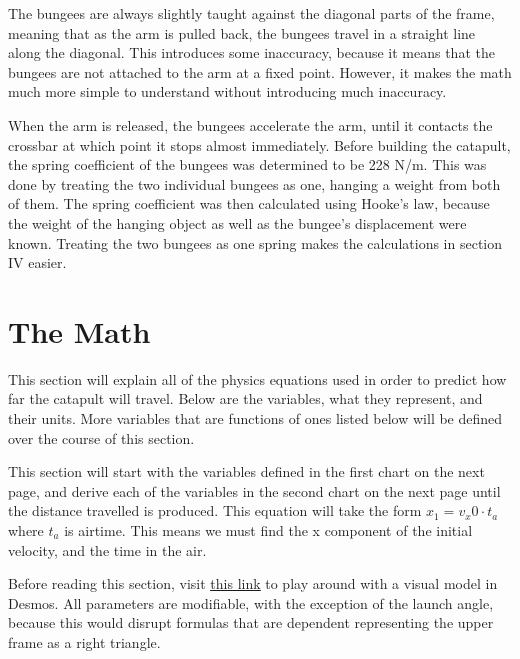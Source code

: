\documentclass[10pt]{article}
\begin{document}
\begin{flushleft}
    \par
    The bungees are always slightly taught against the diagonal parts of the frame, meaning that as the arm is pulled back, the bungees travel in a straight line along the diagonal.
    This introduces some inaccuracy, because it means that the bungees are not attached to the arm at a fixed point.
    However, it makes the math much more simple to understand without introducing much inaccuracy.

    \par
    When the arm is released, the bungees accelerate the arm, until it contacts the crossbar at which point it stops almost immediately.
    Before building the catapult, the spring coefficient of the bungees was determined to be 228 N/m.
    This was done by treating the two individual bungees as one, hanging a weight from both of them.
    The spring coefficient was then calculated using Hooke's law, because the weight of the hanging object as well as the bungee's displacement were known.
    Treating the two bungees as one spring makes the calculations in section IV easier.


  \section{The Math}

    This section will explain all of the physics equations used in order to predict how far the catapult will travel.
    Below are the variables, what they represent, and their units.
    More variables that are functions of ones listed below will be defined over the course of this section.
    
    \par
    This section will start with the variables defined in the first chart on the next page, and derive each of the variables in the second chart on the next page until the distance travelled is produced.
    This equation will take the form $x_1 = v_x0 \cdot t_a$ where $t_a$ is airtime.
    This means we must find the x component of the initial velocity, and the time in the air.

    \par
    Before reading this section, visit \href{https://www.desmos.com/calculator/lioxjeyth8}{\underline{this link}} to play around with a visual model in Desmos. 
    All parameters are modifiable, with the exception of the launch angle, because this would disrupt formulas that are dependent representing the upper frame as a right triangle.


\end{flushleft}
\end{document}
